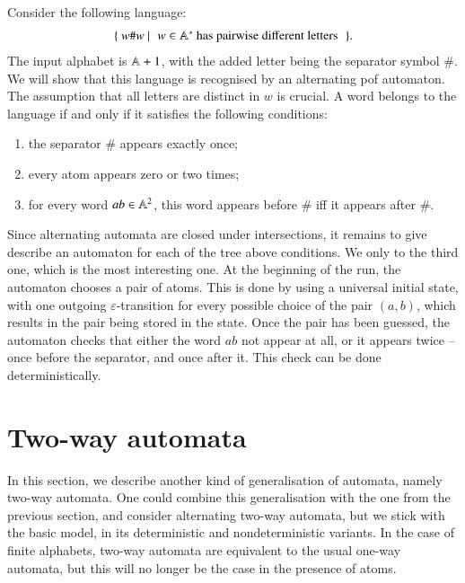 \begin{myexample} Consider the following language:
	\begin{align*}
		\setbuild{ w\#w}{$w \in \atoms^*$ has pairwise different letters}.
	\end{align*}
	The input alphabet is $\mathbb A + 1$, with the added letter being the separator symbol $\#$. We will show that this language is recognised by an alternating pof automaton. 
	The assumption that all letters are distinct in $w$ is crucial. 
	A word belongs to the language if and only if it satisfies the following conditions: 
	\begin{enumerate}
			\item the separator $\#$ appears exactly once;
		\item every atom appears zero or two times;
		\item for every word $ab \in \mathbb A^2$, this word appears before $\#$ iff it appears after $\#$.
	\end{enumerate}
	Since alternating automata are closed under intersections, it remains to give describe an automaton for each of the tree above conditions. We only to the third one, which is the most interesting one. At the beginning of the run, the automaton chooses a pair of atoms. This is done by using a universal initial state, with one outgoing $\varepsilon$-transition for every possible choice of the pair $(a,b)$, which results in the pair being stored in the state. Once the pair has been guessed, the automaton  checks that either the word $ab$  not appear at all, or it appears twice -- once before the separator, and once after it. This check can be done deterministically.
\end{myexample}

\exercisepart





\section{Two-way automata}
\label{sec:pof-two-way}
In this section, we describe another kind of generalisation of automata, namely two-way automata. One could combine this generalisation with the one from the previous section, and consider alternating two-way automata, but we stick with the basic model, in its deterministic and nondeterministic variants. In the case of finite alphabets, two-way automata are equivalent to the usual one-way automata, but this will no longer be the case in the presence of atoms. 


